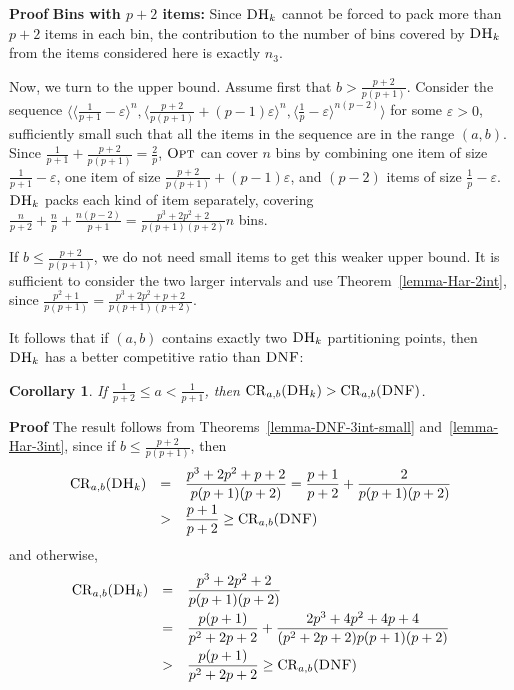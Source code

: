 \documentclass[11pt]{article}
\newtheorem{xcorollary}{Corollary}
\newenvironment{corollary}{\begin{xcorollary}\rm}{\end{xcorollary}}
\newenvironment{proof}{\begin{trivlist}\item[]{\bf Proof }}{\hspace*{\fill}\raisebox{-1pt}{\boldmath$\Box$}\end{trivlist}}
\newcommand{\OPT}{\ensuremath{\operatorname{\textsc{Opt}}}\xspace}
\newcommand{\DNF}{\ensuremath{\operatorname{\textsc{DNF}}}\xspace}
\newcommand{\DHk}{{\ensuremath{\textsc{DH}_k}}\xspace}
\newcommand{\SEQ}[1]{\langle #1 \rangle}
\newcommand{\CRab}[1]{\ensuremath{\mathrm{CR}_{a,b}(#1)}\xspace}
\newcommand{\p}{p}
\begin{document}
\begin{proof}
{\bf Bins with $\p+2$ items:}
Since \DHk cannot be forced to pack more than $\p+2$ items in each bin,
the contribution to the number of bins covered by \DHk from the
items considered here is exactly $n_3$.
 

Now, we turn to the upper bound.
Assume first that $b > \frac{\p+2}{\p(\p+1)}$.
Consider the sequence
$\SEQ{\SEQ{\frac{1}{\p+1}-\varepsilon}^n,
      \SEQ{\frac{\p+2}{\p(\p+1)}+(\p-1)\varepsilon}^n,
      \SEQ{\frac{1}{\p}-\varepsilon}^{n(\p-2)}}$
for some $\varepsilon>0$,
sufficiently small such that all the items in the sequence are in
the range $(a,b)$.
Since $\frac{1}{\p+1} + \frac{\p+2}{\p(\p+1)} = \frac{2}{\p}$,
\OPT can cover $n$ bins by combining one
item of size $\frac{1}{\p+1}-\varepsilon$, one item of size 
$\frac{\p+2}{\p(\p+1)}+(\p-1)\varepsilon$, and $(\p-2)$ items of size
$\frac{1}{\p}-\varepsilon$. 
\DHk packs each kind of item
separately, covering $\frac{n}{\p+2}+\frac{n}{\p}+\frac{n(\p-2)}{\p+1} =
\frac{\p^3+2\p^2+2}{\p(\p+1)(\p+2)}n$ bins. 
 
If $b \leq \frac{\p+2}{\p(\p+1)}$,
 we do not need small items to get this weaker upper bound.
 It is sufficient to consider the two larger intervals and use Theorem~\ref{lemma-Har-2int}, 
 since $\frac{\p^2+1}{\p(\p+1)}=\frac{\p^3+2\p^2+\p+2}{\p(\p+1)(\p+2)}$.
\end{proof}


It follows that if $(a,b)$ contains exactly two \DHk partitioning
points, then \DHk has a better competitive ratio than \DNF:

\begin{corollary}
\label{cor:abcomp}
 If $\frac{1}{\p+2}\leq a < \frac{1}{\p+1}$, then $\CRab{\DHk} > \CRab{\DNF}$.
\end{corollary}
\begin{proof}
The result follows from Theorems~\ref{lemma-DNF-3int-small} and~\ref{lemma-Har-3int}, 
since if $b \leq \frac{\p+2}{\p(\p+1)}$, then
\[
\begin{array}{rcl}
\CRab{\DHk} & = & \displaystyle \frac{\p^3+2\p^2+\p+2}{\p(\p+1)(\p+2)} = 
                  \frac{\p+1}{\p+2} + \frac{2}{\p(\p+1)(\p+2)} \\[2ex]
& > & \displaystyle\frac{\p+1}{\p+2} \geq \CRab{\DNF}
\end{array}
\]
and otherwise,
\[
\begin{array}{rcl}
\CRab{\DHk} & = & \displaystyle \frac{\p^3+2\p^2+2}{\p(\p+1)(\p+2)} \\[2ex]
            & = & \displaystyle 
                  \frac{\p(\p+1)}{\p^2+2\p+2} +
                  \frac{2\p^3+4\p^2+4\p+4}{(\p^2+2\p+2)\p(\p+1)(\p+2)} \\[2ex]
& > &  \displaystyle\frac{\p(\p+1)}{\p^2+2\p+2} \geq  \CRab{\DNF}
\end{array}
\]
\end{proof}
\end{document}
